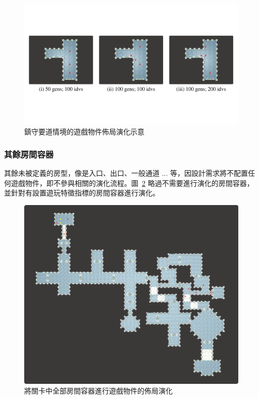 \begin{figure}[H]
  \begin{center}
    \includegraphics[width=1.0\textwidth]{figures/applied-ga-on-volume-battlepath-trunk.pdf}
    \caption{鎮守要道情境的遊戲物件佈局演化示意} 
    \label{fig:applied-ga-on-volume-battlepath-trunk}
  \end{center}
\end{figure}

\subsubsection{其餘房間容器}
\label{sssec:method-segments-appliedonvolumes-others}

其餘未被定義的房型，像是入口、出口、一般通道 ... 等，因設計需求將不配置任何遊戲物件，即不參與相關的演化流程。圖~\ref{fig:applied-ga-on-volume-all} 略過不需要進行演化的房間容器，並針對有設置遊玩特徵指標的房間容器進行演化。

\begin{figure}[!htb]
  \begin{center}
    \includegraphics[width=1.0\textwidth]{figures/applied-ga-on-volume-all.png}
    \caption{將關卡中全部房間容器進行遊戲物件的佈局演化} 
    \label{fig:applied-ga-on-volume-all}
  \end{center}
\end{figure}

